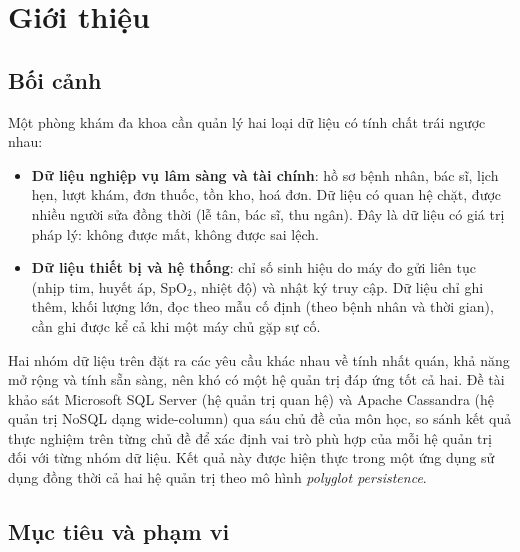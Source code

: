 \section{Giới thiệu}

\subsection{Bối cảnh}
Một phòng khám đa khoa cần quản lý hai loại dữ liệu có tính chất trái ngược nhau:
\begin{itemize}
    \item \textbf{Dữ liệu nghiệp vụ lâm sàng và tài chính}: hồ sơ bệnh nhân, bác sĩ, lịch hẹn, lượt khám, đơn thuốc, tồn kho, hoá đơn. Dữ liệu có quan hệ chặt, được nhiều người sửa đồng thời (lễ tân, bác sĩ, thu ngân). Đây là dữ liệu có giá trị pháp lý: không được mất, không được sai lệch.
    \item \textbf{Dữ liệu thiết bị và hệ thống}: chỉ số sinh hiệu do máy đo gửi liên tục (nhịp tim, huyết áp, SpO$_2$, nhiệt độ) và nhật ký truy cập. Dữ liệu chỉ ghi thêm, khối lượng lớn, đọc theo mẫu cố định (theo bệnh nhân và thời gian), cần ghi được kể cả khi một máy chủ gặp sự cố.
\end{itemize}

Hai nhóm dữ liệu trên đặt ra các yêu cầu khác nhau về tính nhất quán, khả năng mở rộng và tính sẵn sàng, nên khó có một hệ quản trị đáp ứng tốt cả hai. Đề tài khảo sát Microsoft SQL Server (hệ quản trị quan hệ) và Apache Cassandra (hệ quản trị NoSQL dạng wide-column) qua sáu chủ đề của môn học, so sánh kết quả thực nghiệm trên từng chủ đề để xác định vai trò phù hợp của mỗi hệ quản trị đối với từng nhóm dữ liệu. Kết quả này được hiện thực trong một ứng dụng sử dụng đồng thời cả hai hệ quản trị theo mô hình \textit{polyglot persistence}.

\subsection{Mục tiêu và phạm vi}

